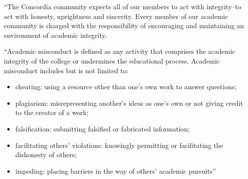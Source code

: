 \documentclass{tufte-handout}
\begin{document}

``The Concordia community expects all of our members to act with integrity--to act with honesty, uprightness and sincerity. Every member of our academic community is charged with the responsibility of encouraging and maintaining an environment of academic integrity.

``Academic misconduct is defined as any activity that comprises the academic integrity of the college or undermines the educational process. Academic misconduct includes but is not limited to:

\begin{itemize}
	\item cheating: using a resource other than one's own work to answer questions;
	\item plagiarism: misrepresenting another's ideas as one's own or not giving credit to the creator of a work;
	\item falsification: submitting falsified or fabricated information;
	\item facilitating others' violations: knowingly permitting or facilitating the dishonesty of others;
	\item impeding: placing barriers in the way of others' academic pursuits''
\end{itemize}
\end{document}

